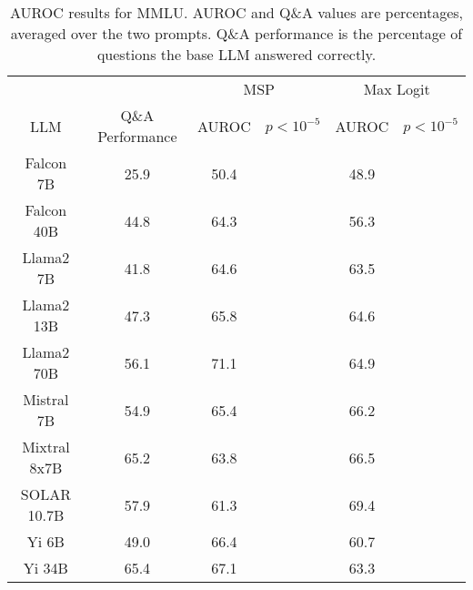 \begin{table*}
\centering
\begin{tabular}{c|c|c|c|c|c}
& & \multicolumn{2}{c|}{MSP} & \multicolumn{2}{c}{Max Logit} \\ 
LLM & Q\&A Performance & AUROC & $p < 10^{-5}$ & AUROC & $p < 10^{-5}$\\ \hline
Falcon 7B & 25.9 & 50.4 &  & 48.9 & \\
Falcon 40B & 44.8 & 64.3 &  & 56.3 & \\
Llama2 7B & 41.8 & 64.6 &  & 63.5 & \\
Llama2 13B & 47.3 & 65.8 &  & 64.6 & \\
Llama2 70B & 56.1 & 71.1 &  & 64.9 & \\
Mistral 7B & 54.9 & 65.4 &  & 66.2 & \\
Mixtral 8x7B & 65.2 & 63.8 &  & 66.5 & \\
SOLAR 10.7B & 57.9 & 61.3 &  & 69.4 & \\
Yi 6B & 49.0 & 66.4 &  & 60.7 & \\
Yi 34B & 65.4 & 67.1 &  & 63.3 & \\
\hline
\end{tabular}
\caption{AUROC results for MMLU. AUROC and Q\&A values are percentages, averaged over the two prompts. Q\&A performance is the percentage of questions the base LLM answered correctly.}
\label{tab:mmlu_auroc}
\end{table*}
